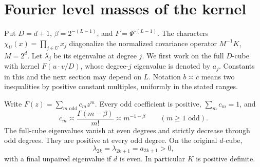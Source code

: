 \section{Fourier level masses of the kernel}\label{app:spectrum}
Put $D=d+1$, $\beta=2^{-(L-1)}$, and $F=\Psi^{\circ(L-1)}$.
The characters $\chi_U(x)=\prod_{j\in U}x_j$ diagonalize the
normalized covariance operator $M^{-1}K$, $M=2^d$. Let $\lambda_j$
be its eigenvalue at degree $j$. We first work on the full $D$-cube
with kernel $F(u\cdot v/D)$, whose degree-$j$ eigenvalue is denoted
by $a_j$. Constants in this and the next section may depend on $L$.
Notation $b\asymp c$ means two inequalities by positive constant
multiples, uniformly in the stated ranges.

\begin{lemma}\label{lem:power}
Write $F(z)=\sum_{m\text{ odd}}c_mz^m$. Every odd coefficient is
positive, $\sum_m c_m=1$, and
\[
 c_m\asymp\frac{\Gamma(m-\beta)}{m!}\asymp m^{-1-\beta}
 \qquad(m\ge1\text{ odd}).
\]
The full-cube eigenvalues vanish at even degrees and strictly decrease
through odd degrees. They are positive at every odd degree. On the
original $d$-cube,
\[
 \lambda_{2k}=\lambda_{2k+1}=a_{2k+1}>0,
\]
with a final unpaired eigenvalue if $d$ is even. In particular $K$
is positive definite.
\end{lemma}
